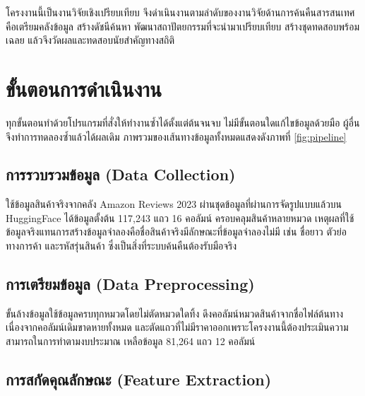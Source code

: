 
โครงงานนี้เป็นงานวิจัยเชิงเปรียบเทียบ จึงดำเนินงานตามลำดับของงานวิจัยด้านการค้นคืนสารสนเทศ คือเตรียมคลังข้อมูล สร้างดัชนีค้นหา พัฒนาสถาปัตยกรรมที่จะนำมาเปรียบเทียบ สร้างชุดทดสอบพร้อมเฉลย แล้วจึงวัดผลและทดสอบนัยสำคัญทางสถิติ

\section{ขั้นตอนการดำเนินงาน}

ทุกขั้นตอนทำด้วยโปรแกรมที่สั่งให้ทำงานซ้ำได้ตั้งแต่ต้นจนจบ ไม่มีขั้นตอนใดแก้ไขข้อมูลด้วยมือ ผู้อื่นจึงทำการทดลองซ้ำแล้วได้ผลเดิม ภาพรวมของเส้นทางข้อมูลทั้งหมดแสดงดังภาพที่ \ref{fig:pipeline}



\subsection{การรวบรวมข้อมูล (Data Collection)}

ใช้ข้อมูลสินค้าจริงจากคลัง Amazon Reviews 2023 \cite{hou2024amazon} ผ่านชุดข้อมูลที่ผ่านการจัดรูปแบบแล้วบน HuggingFace ได้ข้อมูลตั้งต้น 117{,}243 แถว 16 คอลัมน์ ครอบคลุมสินค้าหลายหมวด เหตุผลที่ใช้ข้อมูลจริงแทนการสร้างข้อมูลจำลองคือชื่อสินค้าจริงมีลักษณะที่ข้อมูลจำลองไม่มี เช่น ชื่อยาว ตัวย่อทางการค้า และรหัสรุ่นสินค้า ซึ่งเป็นสิ่งที่ระบบค้นคืนต้องรับมือจริง

\subsection{การเตรียมข้อมูล (Data Preprocessing)}

ขั้นล้างข้อมูลใช้ข้อมูลครบทุกหมวดโดยไม่ตัดหมวดใดทิ้ง ดึงคอลัมน์หมวดสินค้าจากชื่อไฟล์ต้นทางเนื่องจากคอลัมน์เดิมขาดหายทั้งหมด และตัดแถวที่ไม่มีราคาออกเพราะโครงงานนี้ต้องประเมินความสามารถในการทำตามงบประมาณ เหลือข้อมูล 81{,}264 แถว 12 คอลัมน์

\subsection{การสกัดคุณลักษณะ (Feature Extraction)}

